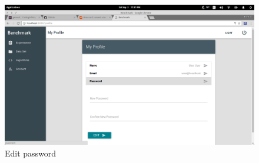 \documentclass[11pt,a4paper]{article}
\begin{document}
\begin{figure}[H]
	\begin{center}
		\includegraphics[scale=0.3]{../Images/User Manual/Profile Page3.png}
		\caption{Edit password}
		\label{fig:ProfilePage3}
	\end{center}  
\end{figure}
\clearpage
\end{document}
